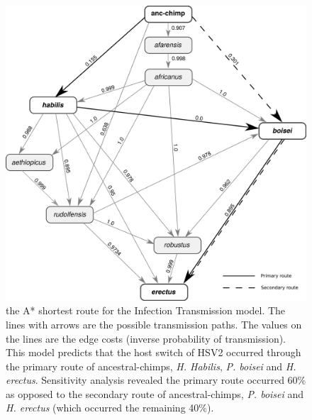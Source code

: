 \documentclass[fleqn,10pt]{wlscirep}
\begin{document}
\begin{figure}[!tbhp]
  \centering
  \includegraphics[width=\textwidth]{figs/dag-it}
  \caption{the A* shortest route for the Infection Transmission model. The lines with arrows are the possible transmission paths. The values on the lines are the edge costs (inverse probability of transmission). This model predicts that the host switch of HSV2 occurred through the primary route of ancestral-chimps, \textit{H. Habilis}, \textit{P. boisei} and \textit{H. erectus}. Sensitivity analysis revealed the primary route occurred 60\% as opposed to the secondary route of ancestral-chimps, \textit{P. boisei} and \textit{H. erectus} (which occurred the remaining 40\%).}
  \label{fig:dag-it}   
\end{figure}     
\end{document}
